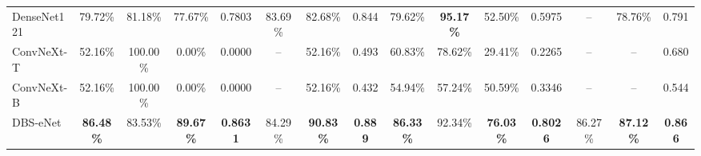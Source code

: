 \begin{table}[htbp]
{\begin{tabular}{lcccccccccccccc}
      DenseNet121 & 79.72\%                            & 81.18\%                            & 77.67\%          & 0.7803          & 83.69\%          & 82.68\%          & 0.844          & 79.62\%          & \textbf{95.17\%} & 52.50\%          & 0.5975          & –                & 78.76\%          & 0.791          \\
      ConvNeXt-T  & 52.16\%                            & 100.00\%                           & 0.00\%           & 0.0000          & –                & 52.16\%          & 0.493          & 60.83\%          & 78.62\%          & 29.41\%          & 0.2265          & –                & –                & 0.680          \\
      ConvNeXt-B  & 52.16\%                            & 100.00\%                           & 0.00\%           & 0.0000          & –                & 52.16\%          & 0.432          & 54.94\%          & 57.24\%          & 50.59\%          & 0.3346          & –                & –                & 0.544          \\
      DBS-eNet    & \textbf{86.48\%}                   & 83.53\%                            & \textbf{89.67\%} & \textbf{0.8631} & 84.29\%          & \textbf{90.83\%} & \textbf{0.889} & \textbf{86.33\%} & 92.34\%          & \textbf{76.03\%} & \textbf{0.8026} & 86.27\%          & \textbf{87.12\%} & \textbf{0.866} \\
      \bottomrule
    \end{tabular}
  }
  \label{tab:chap03_DBS-eNet_vs_CNN}
\end{table}

